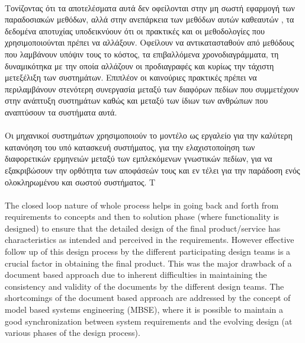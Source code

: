 \documentclass[a4paper,12pt,twoside]{report}
\begin{document}
{			\paragraph{} {Τονίζοντας ότι τα αποτελέσματα αυτά δεν οφείλονται στην μη σωστή εφαρμογή των παραδοσιακών μεθόδων, αλλά στην ανεπάρκεια των μεθόδων αυτών καθεαυτών \cite{MDSysDevelIBM}, τα δεδομένα αποτυχίας υποδεικνύουν ότι οι πρακτικές και οι μεθοδολογίες που χρησιμοποιούνται πρέπει να αλλάξουν. Οφείλουν να αντικατασταθούν από μεθόδους που λαμβάνουν υπόψιν τους το κόστος, τα επιβαλλόμενα χρονοδιαγράμματα, τη δυναμικότηκα με την οποία αλλάζουν οι προδιαγραφές και κυρίως την τάχιστη μετεξέλιξη των συστημάτων. Επιπλέον οι καινούριες πρακτικές πρέπει να περιλαμβάνουν στενότερη συνεργασία μεταξύ των διαφόρων πεδίων που συμμετέχουν στην ανάπτυξη συστημάτων καθώς και μεταξύ των ίδιων των ανθρώπων που αναπτύσουν τα συστήματα αυτά. 
			}
			
			\paragraph{} {Οι μηχανικοί συστημάτων χρησιμοποιούν το μοντέλο ως εργαλείο για την καλύτερη κατανόηση του υπό κατασκευή συστήματος, για την ελαχιστοποίηση των διαφορετικών ερμηνειών μεταξύ των εμπλεκόμενων γνωστικών πεδίων, για να εξακριβώσουν την ορθότητα των αποφάσεών τους και εν τέλει για την παράδοση ενός ολοκληρωμένου και σωστού συστήματος. Τ
			}
			
			\paragraph{} {\cite{IntegratedApproachMBMechatronicDesign}}
			
			\paragraph{} {The closed loop nature of whole process helps in going back and forth from requirements to concepts and then to solution phase (where functionality is designed) to ensure that the detailed design of the final product/service has characteristics as intended and perceived in the requirements. However effective follow up of this design process by the different participating design teams is a crucial factor in obtaining the final product. This was the major drawback of a document based  approach due to inherent difficulties in maintaining the consistency and validity of the documents by the different design teams. The shortcomings of the document based approach are addressed by the concept of model based systems engineering (MBSE), where it is possible to maintain a good synchronization between system requirements and the evolving design (at various phases of the design process). \cite{ModelBasedBMechatronisSysMLMatlab}
			}
			
}
\end{document}
